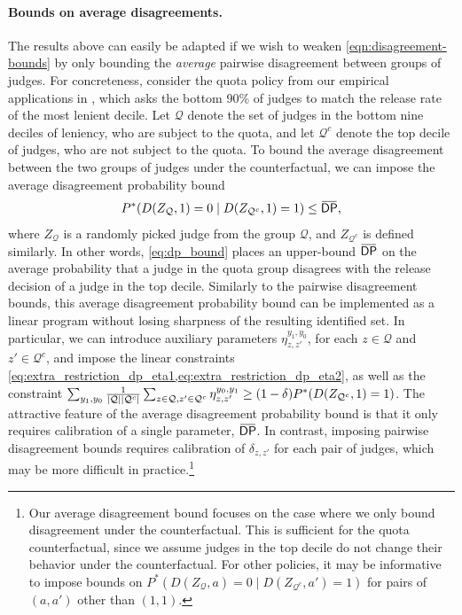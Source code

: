 \documentclass[12pt]{article}%
\theoremstyle{definition}
\DeclarePairedDelimiter\abs{\lvert}{\rvert}
\newcommand\1{\operatorname{I}\indicatorfence}
\newcommand{\overbar}[1]{\mkern 1.5mu\overline{\mkern-1.5mu#1\mkern-1.5mu}%
  \mkern 1.5mu}%
\newcommand{\DP}{\mathsf{DP}}
\begin{document}
\paragraph{Bounds on average disagreements.} The results above can easily be
adapted if we wish to weaken \cref{eqn:disagreement-bounds} by only
bounding the \emph{average} pairwise disagreement between groups of judges. For
concreteness, consider the quota policy from our empirical applications in
, which asks the bottom 90\% of judges to match the
release rate of the most lenient decile. Let $\mathcal{Q}$ denote the set of
judges in the bottom nine deciles of leniency, who are subject to the quota, and
let $\mathcal{Q}^c$ denote the top decile of judges, who are not subject to the
quota. To bound the average disagreement between the two groups of judges under
the counterfactual, we can impose the average disagreement probability bound
\begin{equation}\label{eq:dp_bound}
P^*(D(Z_{\mathcal{Q}},1)=0\mid D({Z}_{\mathcal{Q}^{c}},1)=1)\leq \overbar{\DP},
\end{equation}
where $Z_{\mathcal{Q}}$ is a randomly picked judge from the group $\mathcal{Q}$,
and ${Z}_{\mathcal{Q}^{c}}$ is defined similarly. In other words, \eqref{eq:dp_bound} places an upper-bound $\overbar{\DP}$ on the average probability
that a judge in the quota group disagrees with the release decision of a judge
in the top decile. Similarly to the pairwise disagreement bounds, this average
disagreement probability bound can be implemented as a linear program without losing
sharpness of the resulting identified set. In particular, we can introduce auxiliary parameters $\eta_{z, z'}^{y_{1}, y_{0}}$, for each
$z\in\mathcal{Q}$ and $z'\in\mathcal{Q}^{c}$, and impose the linear
constraints \cref{eq:extra_restriction_dp_eta1,eq:extra_restriction_dp_eta2},
as well as the constraint
$\sum_{y_{1}, y_{0}}\frac{1}{\abs{\mathcal{Q}}\abs{\mathcal{Q}^{c}}}\sum_{z\in\mathcal{Q}, z'\in\mathcal{Q}^{c}}
\eta_{z, z'}^{y_{0}, y_{1}}\geq (1-\delta)P^*(D(Z_{\mathcal{Q}^{c}}, 1)=1)$. The attractive feature of the average disagreement probability bound is that it
only requires calibration of a single parameter, $\overbar{\DP}$. In contrast,
imposing pairwise disagreement bounds requires calibration of $\delta_{z, z'}$
for each pair of judges, which may be more difficult in practice.\footnote{Our
  average disagreement bound focuses on the case where we only bound
  disagreement under the counterfactual. This is sufficient for the quota
  counterfactual, since we assume judges in the top decile do not change their
  behavior under the counterfactual. For other policies, it may be informative to impose bounds on
  $P^*(D(Z_{\mathcal{Q}}, a)=0\mid D({Z}_{\mathcal{Q}^{c}},a')=1)$ for pairs of
  $(a, a')$ other than $(1,1)$.}
\end{document}
